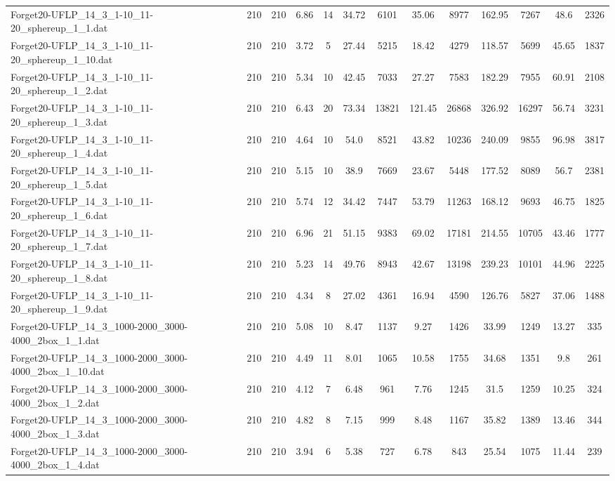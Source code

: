 \begin{table}[!ht]
{\begin{tabular}{lcccccccccccc}
Forget20-UFLP\_14\_3\_1-10\_11-20\_sphereup\_1\_1.dat & 210 & 210 & 6.86 & 14 & 34.72 & 6101 & 35.06 & 8977 & 162.95 & 7267 & 48.6 & 2326 \\
Forget20-UFLP\_14\_3\_1-10\_11-20\_sphereup\_1\_10.dat & 210 & 210 & 3.72 & 5 & 27.44 & 5215 & 18.42 & 4279 & 118.57 & 5699 & 45.65 & 1837 \\
Forget20-UFLP\_14\_3\_1-10\_11-20\_sphereup\_1\_2.dat & 210 & 210 & 5.34 & 10 & 42.45 & 7033 & 27.27 & 7583 & 182.29 & 7955 & 60.91 & 2108 \\
Forget20-UFLP\_14\_3\_1-10\_11-20\_sphereup\_1\_3.dat & 210 & 210 & 6.43 & 20 & 73.34 & 13821 & 121.45 & 26868 & 326.92 & 16297 & 56.74 & 3231 \\
Forget20-UFLP\_14\_3\_1-10\_11-20\_sphereup\_1\_4.dat & 210 & 210 & 4.64 & 10 & 54.0 & 8521 & 43.82 & 10236 & 240.09 & 9855 & 96.98 & 3817 \\
Forget20-UFLP\_14\_3\_1-10\_11-20\_sphereup\_1\_5.dat & 210 & 210 & 5.15 & 10 & 38.9 & 7669 & 23.67 & 5448 & 177.52 & 8089 & 56.7 & 2381 \\
Forget20-UFLP\_14\_3\_1-10\_11-20\_sphereup\_1\_6.dat & 210 & 210 & 5.74 & 12 & 34.42 & 7447 & 53.79 & 11263 & 168.12 & 9693 & 46.75 & 1825 \\
Forget20-UFLP\_14\_3\_1-10\_11-20\_sphereup\_1\_7.dat & 210 & 210 & 6.96 & 21 & 51.15 & 9383 & 69.02 & 17181 & 214.55 & 10705 & 43.46 & 1777 \\
Forget20-UFLP\_14\_3\_1-10\_11-20\_sphereup\_1\_8.dat & 210 & 210 & 5.23 & 14 & 49.76 & 8943 & 42.67 & 13198 & 239.23 & 10101 & 44.96 & 2225 \\
Forget20-UFLP\_14\_3\_1-10\_11-20\_sphereup\_1\_9.dat & 210 & 210 & 4.34 & 8 & 27.02 & 4361 & 16.94 & 4590 & 126.76 & 5827 & 37.06 & 1488 \\
Forget20-UFLP\_14\_3\_1000-2000\_3000-4000\_2box\_1\_1.dat & 210 & 210 & 5.08 & 10 & 8.47 & 1137 & 9.27 & 1426 & 33.99 & 1249 & 13.27 & 335 \\
Forget20-UFLP\_14\_3\_1000-2000\_3000-4000\_2box\_1\_10.dat & 210 & 210 & 4.49 & 11 & 8.01 & 1065 & 10.58 & 1755 & 34.68 & 1351 & 9.8 & 261 \\
Forget20-UFLP\_14\_3\_1000-2000\_3000-4000\_2box\_1\_2.dat & 210 & 210 & 4.12 & 7 & 6.48 & 961 & 7.76 & 1245 & 31.5 & 1259 & 10.25 & 324 \\
Forget20-UFLP\_14\_3\_1000-2000\_3000-4000\_2box\_1\_3.dat & 210 & 210 & 4.82 & 8 & 7.15 & 999 & 8.48 & 1167 & 35.82 & 1389 & 13.46 & 344 \\
Forget20-UFLP\_14\_3\_1000-2000\_3000-4000\_2box\_1\_4.dat & 210 & 210 & 3.94 & 6 & 5.38 & 727 & 6.78 & 843 & 25.54 & 1075 & 11.44 & 239 \\

\end{tabular}}
\end{table}

